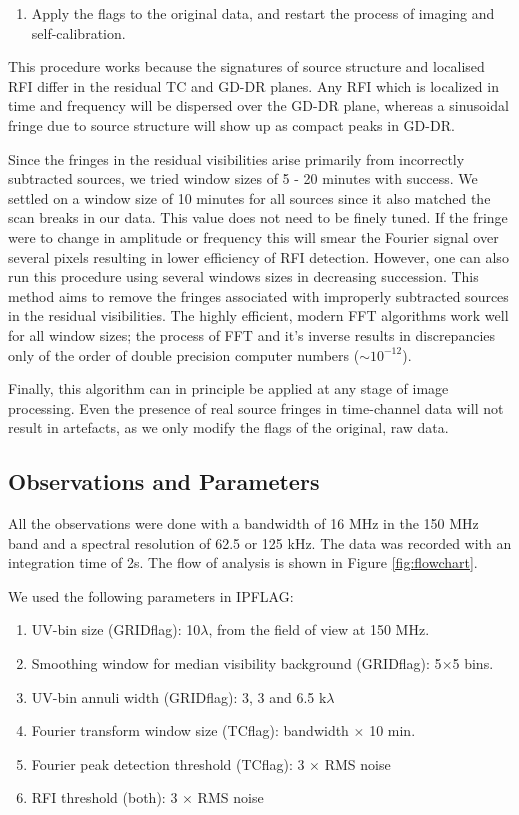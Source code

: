 \documentclass[twocolumn]{aastex61}
\begin{document}
{\begin{enumerate}
   \item Apply the flags to the original data, and restart the process of
      imaging and self-calibration.

\end{enumerate}

This procedure works because the signatures of source structure and localised
RFI differ in the residual TC and GD-DR planes. Any RFI which is localized in
time and frequency will be dispersed over the GD-DR plane, whereas a sinusoidal
fringe due to source structure will show up as compact peaks in GD-DR.

Since the fringes in the residual visibilities arise primarily from incorrectly
subtracted sources, we tried window sizes of 5 - 20 minutes with success. We
settled on a window size of 10 minutes for all sources since it also matched the
scan breaks in our data. This value does not need to be finely tuned.  If the
fringe were to change in amplitude or frequency this will smear the Fourier
signal over several pixels resulting in lower efficiency of RFI detection.
However, one can also run this procedure using several windows sizes in
decreasing succession. This method aims to remove the fringes associated
with improperly subtracted sources in the residual visibilities. The highly
efficient, modern FFT algorithms work well for all window sizes; the process of
FFT and it's inverse results in discrepancies only of the order of double
precision computer numbers ($\sim 10^{-12}$).

Finally, this algorithm can in principle be applied at any stage of image
processing.  Even the presence of real source fringes in time-channel
data will not result in artefacts, as we only modify the flags of the original,
raw data.

\subsection{Observations and Parameters}

All the observations were done with a bandwidth of 16 MHz in the 150 MHz band
and a spectral resolution of 62.5 or 125 kHz. The data was recorded with an
integration time of 2s. The flow of analysis is shown in Figure
\ref{fig:flowchart}.

We used the following parameters in IPFLAG:
\begin{enumerate}
   \item UV-bin size (GRIDflag): 10$\lambda$, from the field of view at 150 MHz.
   \item Smoothing window for median visibility background (GRIDflag):
      5$\times$5 bins.
   \item UV-bin annuli width (GRIDflag): 3, 3 and 6.5 k$\lambda$
   \item Fourier transform window size (TCflag): bandwidth $\times$ 10 min.
   \item Fourier peak detection threshold (TCflag): 3 $\times$ RMS noise
   \item RFI threshold (both): 3 $\times$ RMS noise
\end{enumerate}

}
\end{document}
